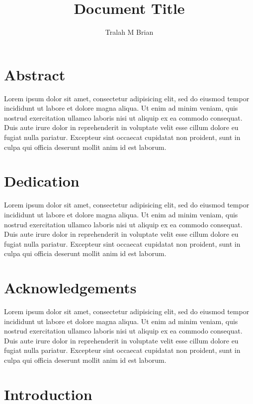\documentclass[]{article}
\title{Document Title}
\author{Tralah M Brian}
\begin{document}
\maketitle

\newpage


\section*{Abstract}
Lorem ipsum dolor sit amet, consectetur adipisicing elit, sed do eiusmod tempor incididunt ut labore et dolore magna aliqua. Ut enim ad minim veniam, quis nostrud exercitation ullamco laboris nisi ut aliquip ex ea commodo consequat. Duis aute irure dolor in reprehenderit in voluptate velit esse cillum dolore eu fugiat nulla pariatur. Excepteur sint occaecat cupidatat non proident, sunt in culpa qui officia deserunt mollit anim id est laborum.

\newpage

\section*{Dedication}
Lorem ipsum dolor sit amet, consectetur adipisicing elit, sed do eiusmod tempor incididunt ut labore et dolore magna aliqua. Ut enim ad minim veniam, quis nostrud exercitation ullamco laboris nisi ut aliquip ex ea commodo consequat. Duis aute irure dolor in reprehenderit in voluptate velit esse cillum dolore eu fugiat nulla pariatur. Excepteur sint occaecat cupidatat non proident, sunt in culpa qui officia deserunt mollit anim id est laborum.

\newpage

\section*{Acknowledgements}
Lorem ipsum dolor sit amet, consectetur adipisicing elit, sed do eiusmod tempor incididunt ut labore et dolore magna aliqua. Ut enim ad minim veniam, quis nostrud exercitation ullamco laboris nisi ut aliquip ex ea commodo consequat. Duis aute irure dolor in reprehenderit in voluptate velit esse cillum dolore eu fugiat nulla pariatur. Excepteur sint occaecat cupidatat non proident, sunt in culpa qui officia deserunt mollit anim id est laborum.

\newpage

\doublespacing
\tableofcontents
\singlespacing

\newpage

\section{Introduction}
\end{document}
